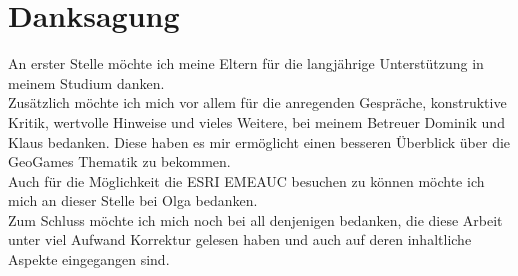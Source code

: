 \section*{Danksagung}
\label{sec:Dank}

An erster Stelle möchte ich meine Eltern für die langjährige Unterstützung in meinem Studium danken.\\
Zusätzlich möchte ich mich vor allem für die anregenden Gespräche, konstruktive Kritik, wertvolle Hinweise und vieles Weitere, bei meinem Betreuer Dominik und Klaus bedanken.
Diese haben es mir ermöglicht einen besseren Überblick über die GeoGames Thematik zu bekommen.\\
Auch für die Möglichkeit die ESRI EMEAUC besuchen zu können möchte ich mich an dieser Stelle bei Olga bedanken.\\
Zum Schluss möchte ich mich noch bei all denjenigen bedanken, die diese Arbeit unter viel Aufwand Korrektur gelesen haben und auch auf deren inhaltliche Aspekte eingegangen sind.\\


